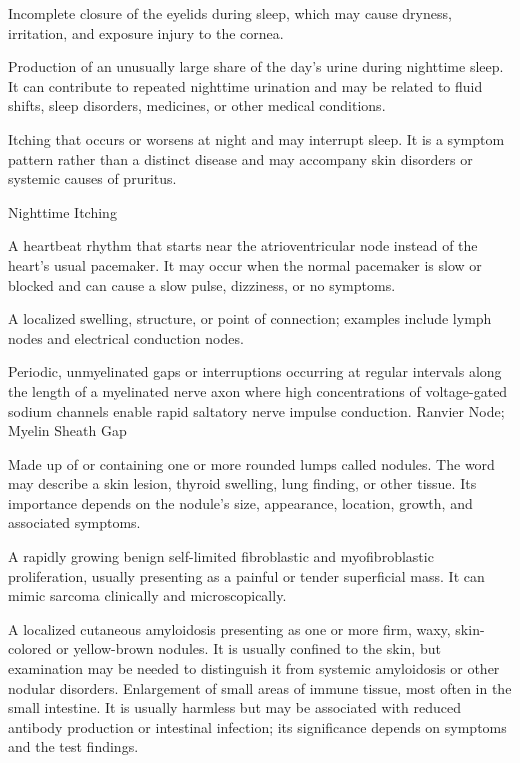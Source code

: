  Incomplete closure of the eyelids during sleep, which may cause dryness, irritation, and exposure injury to the cornea.

 Production of an unusually large share of the day’s urine during nighttime sleep. It can contribute to repeated nighttime urination and may be related to fluid shifts, sleep disorders, medicines, or other medical conditions.

 Itching that occurs or worsens at night and may interrupt sleep. It is a symptom pattern rather than a distinct disease and may accompany skin disorders or systemic causes of pruritus.

\synonyms
Nighttime Itching

 A heartbeat rhythm that starts near the atrioventricular node instead of the heart’s usual pacemaker. It may occur when the normal pacemaker is slow or blocked and can cause a slow pulse, dizziness, or no symptoms.

 A localized swelling, structure, or point of connection; examples include lymph nodes and electrical conduction nodes.

 Periodic, unmyelinated gaps or interruptions occurring at regular intervals along the length of a myelinated nerve axon where high concentrations of voltage-gated sodium channels enable rapid saltatory nerve impulse conduction.
\synonyms
Ranvier Node; Myelin Sheath Gap

 Made up of or containing one or more rounded lumps called nodules. The word may describe a skin lesion, thyroid swelling, lung finding, or other tissue. Its importance depends on the nodule’s size, appearance, location, growth, and associated symptoms.

 A rapidly growing benign self-limited fibroblastic and myofibroblastic proliferation, usually presenting as a painful or tender superficial mass. It can mimic sarcoma clinically and microscopically.

 A localized cutaneous amyloidosis presenting as one or more firm, waxy, skin-colored or yellow-brown nodules. It is usually confined to the skin, but examination may be needed to distinguish it from systemic amyloidosis or other nodular disorders.
 Enlargement of small areas of immune tissue, most often in the small intestine. It is usually harmless but may be associated with reduced antibody production or intestinal infection; its significance depends on symptoms and the test findings.

